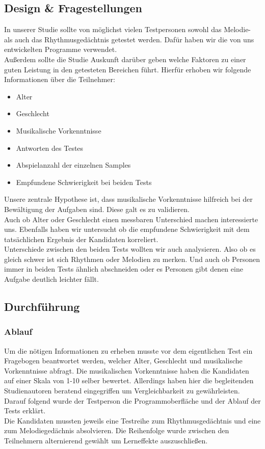 \documentclass{acm_proc_article-sp}
\begin{document}
\subsection{Design \& Fragestellungen}
In unserer Studie sollte von möglichst vielen Testpersonen sowohl das Melodie- als auch das Rhythmusgedächtnis getestet werden. Dafür haben wir die von uns entwickelten Programme verwendet.\\
Außerdem sollte die Studie Auskunft darüber geben welche Faktoren zu einer guten Leistung in den getesteten Bereichen führt. Hierfür erhoben wir folgende Informationen über die Teilnehmer:
\begin{itemize} 
\item Alter
\item Geschlecht
\item Musikalische Vorkenntnisse
\item Antworten des Testes
\item Abspielanzahl der einzelnen Samples
\item Empfundene Schwierigkeit bei beiden Tests
\end{itemize}
Unsere zentrale Hypothese ist, dass musikalische Vorkenntnisse hilfreich bei der Bewältigung der Aufgaben sind. Diese galt es zu validieren.\\
Auch ob Alter oder Geschlecht einen messbaren Unterschied machen interessierte uns. Ebenfalls haben wir untersucht ob die empfundene Schwierigkeit mit dem tatsächlichen Ergebnis der Kandidaten korreliert.\\ 
Unterschiede zwischen den beiden Tests wollten wir auch analysieren. Also ob es gleich schwer ist sich Rhythmen oder Melodien zu merken. Und auch ob Personen immer in beiden Tests ähnlich abschneiden oder es Personen gibt denen eine Aufgabe deutlich leichter fällt.
\subsection{Durchführung}

\subsubsection{Ablauf}
Um die nötigen Informationen zu erheben musste vor dem eigentlichen Test ein Fragebogen beantwortet werden, welcher Alter, Geschlecht und musikalische Vorkenntnisse abfragt. Die musikalischen Vorkenntnisse haben die Kandidaten auf einer Skala von 1-10 selber bewertet. Allerdings haben hier die begleitenden Studienautoren beratend eingegriffen um Vergleichbarkeit zu gewährleisten.\\
Darauf folgend wurde der Testperson die Programmoberfläche und der Ablauf der Tests erklärt.\\ 
Die Kandidaten mussten jeweils eine Testreihe zum Rhythmusgedächtnis und eine zum Melodiegedächnis absolvieren. Die Reihenfolge wurde zwischen den Teilnehmern alternierend gewählt um Lerneffekte auszuschließen. \\
\end{document}
